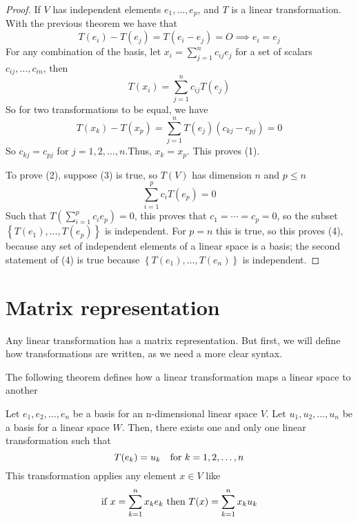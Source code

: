 \documentclass[../linear-spaces.tex]{subfiles}
\begin{document}
\begin{proof}
    If $V$ has independent elements $e_1,\dots,e_p$, and $T$ is a linear transformation.
    With the previous theorem we have that
    \begin{equation}
        T(e_i) - T(e_j) = T(e_i - e_j) = O \implies e_i = e_j
    \end{equation}
    For any combination of the basis, let $x_i =\sum_{j=1}^{n}{c_{ij} e_j}$ for a
    set of scalars $c_{ij},\dots,c_{in}$, then
    \begin{equation}
        T(x_i) = \sum_{j=1}^{n}{c_{ij} T(e_j)}
    \end{equation}
    So for two transformations to be equal, we have
    \begin{equation}
        T(x_k) - T(x_p) = \sum_{j=1}^{n}{T(e_j)(c_{kj} - c_{pj})} = 0
    \end{equation}
    So $c_{kj} = c_{pj}$ for $j=1,2,\dots,n$.Thus, $x_k=x_p$. This proves (1).

    To prove (2), suppose (3) is true, so $T(V)$ has dimension $n$ and $p\leq n$
    \begin{equation}
        \sum_{i=1}^{p}c_i{T(e_p)}=0
    \end{equation}
    Such that $T\left(\sum_{i=1}^{p}c_i{e_p}\right)=0$, this proves that $c_1 = \cdots = c_p = 0$, so
    the subset $\left\{T(e_1),\dots,T(e_p)\right\}$ is independent. For $p=n$ this is true, so this proves
    (4), because any set of independent elements of a linear space is a basis; the second
    statement of (4) is true because $\left\{T(e_1),\dots,T(e_n)\right\}$ is independent.
\end{proof}

\section{Matrix representation}

Any linear transformation has a matrix representation. But first, we will
define how transformations are written, as we need a more clear syntax.

The following theorem defines how a linear transformation maps a linear space
to another

\begin{theorem}
    Let $e_1,e_2,\dots,e_n$ be a basis for an n-dimensional linear space $V$. Let $u_1,u_2,\dots,u_n$ be a basis
    for a linear space $W$. Then, there exists one and only one linear transformation such that
    \begin{equation}
        T(e_k) = u_k \quad \textnormal{for } k=1,2,\dots,n
    \end{equation}
    This transformation applies any element $x\in V$ like
    \begin{equation}
        \textnormal{if }x=\sum_{k=1}^{n}{x_k e_k}\textnormal{ then } T(x)=\sum_{k=1}^{n}{x_k u_k}
    \end{equation}
\end{theorem}
\end{document}
